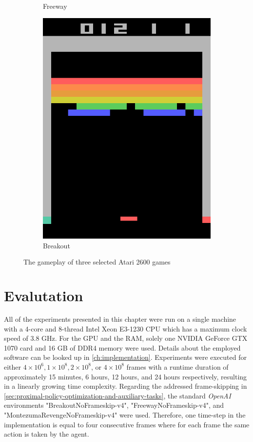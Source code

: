 \documentclass[draft,final]{vutinfth} %
\begin{document}
\begin{figure}[h]
\begin{subfigure}{.3\textwidth}
            \caption{Freeway}
            \label{fig:fway}
        \end{subfigure}
        \begin{subfigure}{.3\textwidth}
            \centering
            \includegraphics[width=.8\linewidth]{figures/breakout.png}
            \caption{Breakout}
            \label{fig:break}
        \end{subfigure} \caption{The gameplay of three selected Atari 2600 games}
        \label{fig:games}
    \end{figure}


    \section{Evalutation}
    All of the experiments presented in this chapter were run on a single machine with a 4-core and 8-thread Intel Xeon E3-1230 CPU which has a maximum clock speed of 3.8 GHz.
    For the GPU and the RAM, solely one NVIDIA GeForce GTX 1070 card and 16 GB of DDR4 memory were used.
    Details about the employed software can be looked up in \autoref{ch:implementation}.
    Experiments were executed for either $4 \times 10^6, 1 \times 10^8, 2 \times 10^8$, or $4 \times 10^8$ frames with a runtime duration of approximately 15 minutes, 6 hours, 12 hours, and 24 hours respectively, resulting in a linearly growing time complexity.
    Regarding the addressed frame-skipping in \autoref{sec:proximal-policy-optimization-and-auxiliary-tasks}, the standard \textit{OpenAI} environments "BreakoutNoFrameskip-v4", "FreewayNoFrameskip-v4", and "MontezumaRevengeNoFrameskip-v4" were used.
    Therefore, one time-step in the implementation is equal to four consecutive frames where for each frame the same action is taken by the agent.
\end{document}

